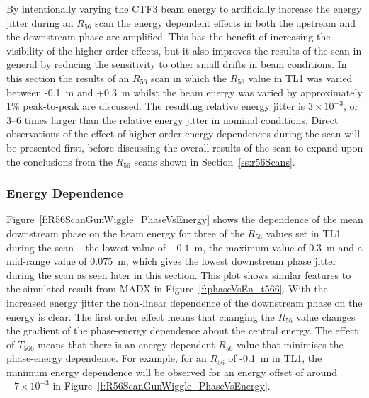 By intentionally varying the CTF3 beam energy to artificially increase the energy jitter during an \(R_{56}\) scan the energy dependent effects in both the upstream and the downstream phase are amplified. This has the benefit of increasing the visibility of the higher order effects, but it also improves the results of the scan in general by reducing the sensitivity to other small drifts in beam conditions. In this section the results of an \(R_{56}\) scan in which the \(R_{56}\) value in TL1 was varied between -0.1~m and +0.3~m whilst the beam energy was varied by approximately 1\% peak-to-peak are discussed. The resulting relative energy jitter is \(3\times10^{-3}\), or 3--6 times larger than the relative energy jitter in nominal conditions. Direct observations of the effect of higher order energy dependences during the scan will be presented first, before discussing the overall results of the scan to expand upon the conclusions from the \(R_{56}\) scans shown in Section~\ref{ss:r56Scans}.

\subsubsection{Energy Dependence}


Figure~\ref{f:R56ScanGunWiggle_PhaseVsEnergy} shows the dependence of the mean downstream phase on the beam energy for three of the \(R_{56}\) values set in TL1 during the scan -- the lowest value of \(-0.1\)~m, the maximum value of \(0.3\)~m and a mid-range value of \(0.075\)~m, which gives the lowest downstream phase jitter during the scan as seen later in this section. This plot shows similar features to the simulated result from MADX in Figure~\ref{f:phaseVsEn_t566}. With the increased energy jitter the non-linear dependence of the downstream phase on the energy is clear. The first order effect means that changing the \(R_{56}\) value changes the gradient of the phase-energy dependence about the central energy. The effect of \(T_{566}\) means that there is an energy dependent \(R_{56}\) value that minimises the phase-energy dependence. For example, for an \(R_{56}\) of -0.1~m in TL1, the minimum energy dependence will be observed for an energy offset of around \(-7\times10^{-3}\) in Figure~\ref{f:R56ScanGunWiggle_PhaseVsEnergy}.


